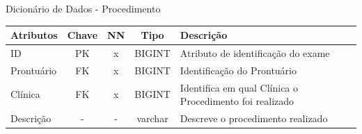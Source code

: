 \documentclass[
    12pt,               %
    openright,          %
    oneside,
    a4paper,            %
    BIBLATEX,           %
    TODO,               %
    english,            %
    brazil              %
    ]{ifsp-spo-inf-ctds}
\begin{document}
    \begin{center}
      \begin{quadro}[H]
      \centering
          \caption{Dicionário de Dados - Procedimento}
          \begin{tabulary}{1.0\textwidth}{|p{9em}|c|c|c|p{19em}|}
        \hline
        Atributos & Chave & NN & Tipo & Descrição\\
        \hline
        ID & PK & x &BIGINT & Atributo de identificação do exame\\
        \hline
        Prontuário & FK & x & BIGINT & Identificação do Prontuário \\
        \hline
        Clínica & FK & x & BIGINT & Identifica em qual Clínica o Procedimento foi realizado\\
        \hline
        Descrição & - & - & varchar & Descreve o procedimento realizado \\
        \hline
        \end{tabulary}
         
          \label{qd: md-Procedimento}
      \end{quadro}
    \end{center}
    
\end{document}
